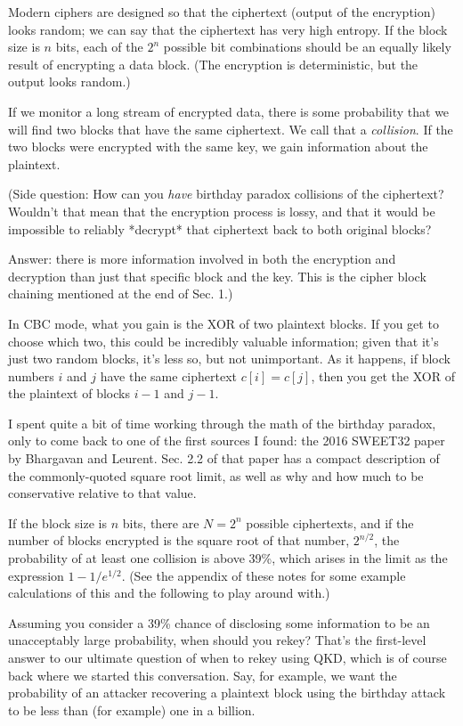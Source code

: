 Modern ciphers are designed so that the ciphertext (output of the
encryption) looks random; we can say that the ciphertext has very high
entropy.  If the block size is $n$ bits, each of the $2^n$ possible
bit combinations should be an equally likely result of encrypting a
data block.  (The encryption is deterministic, but the output looks
random.)

If we monitor a long stream of encrypted data, there is some
probability that we will find two blocks that have the same
ciphertext.  We call that a \emph{collision}.  If the two blocks were
encrypted with the same key, we gain information about the plaintext.

(Side question: How can you \emph{have} birthday paradox collisions of the
ciphertext?  Wouldn't that mean that the encryption process is lossy,
and that it would be impossible to reliably *decrypt* that ciphertext
back to both original blocks?

Answer: there is more information involved in both the encryption and
decryption than just that specific block and the key.  This is the
cipher block chaining mentioned at the end of Sec. 1.)

In CBC mode, what you gain is the XOR of two plaintext blocks.  If you
get to choose which two, this could be incredibly valuable
information; given that it's just two random blocks, it's less so, but
not unimportant.  As it happens, if block numbers $i$ and $j$ have the
same ciphertext $c[i] = c[j]$, then you get the XOR of the plaintext of
blocks $i-1$ and $j-1$.

I spent quite a bit of time working through the math of the birthday
paradox, only to come back to one of the first sources I found: the
2016 SWEET32 paper by Bhargavan and Leurent.  Sec. 2.2 of that paper
has a compact description of the commonly-quoted square root limit, as
well as why and how much to be conservative relative to that value.

If the block size is $n$ bits, there are $N = 2^n$ possible
ciphertexts, and if the number of blocks encrypted is the square root
of that number, $2^{n/2}$, the probability of at least one collision
is above 39\%, which arises in the limit as the expression
$1-1/e^{1/2}$.  (See the appendix of these notes for some example
calculations of this and the following to play around with.)

Assuming you consider a 39\% chance of disclosing some information to
be an unacceptably large probability, when should you rekey?  That's
the first-level answer to our ultimate question of when to rekey using
QKD, which is of course back where we started this conversation.  Say,
for example, we want the probability of an attacker recovering a
plaintext block using the birthday attack to be less than (for
example) one in a billion.

